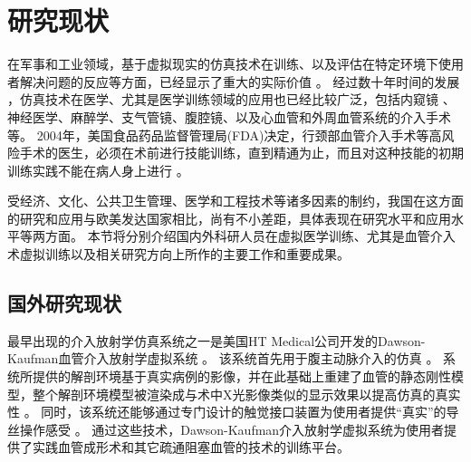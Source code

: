 
\section{研究现状}
\label{sec1-3}


在军事和工业领域，基于虚拟现实的仿真技术在训练、以及评估在特定环境下使用者解决问题的反应等方面，已经显示了重大的实际价值 \cite{Goodwin1978Simulator,Rolfe1986Simulators,Ressler1999Simulators,Wachtel1985Simulators,Liu2013Military}。%
经过数十年时间的发展 \cite{Dawson1998}，仿真技术在医学、尤其是医学训练领域的应用也已经比较广泛，包括内窥镜 \cite{Vining1995Endoscopy,Preminger1996Endoscopy}、神经医学\cite{Kockro2000Neurosurgery,Cotin2005EVE,Ma2007NeuroCath}、麻醉学\cite{Gaba1988Anesthesiology}、支气管镜\cite{Vining1996Bronchoscopy}、腹腔镜\cite{Hon1994Laparoscopy,Derossis1998Laparoscopy}、以及心血管和外周血管系统的介入手术\cite{Chui1998ICard,Cotin2000ICTS,Tan2012NUDT}等。%
2004年，美国食品药品监督管理局(FDA)决定，行颈部血管介入手术等高风险手术的医生，必须在术前进行技能训练，直到精通为止，而且对这种技能的初期训练实践不能在病人身上进行 \cite{Dawson2006Medicine}。%

受经济、文化、公共卫生管理、医学和工程技术等诸多因素的制约，我国在这方面的研究和应用与欧美发达国家相比，尚有不小差距，具体表现在研究水平和应用水平等两方面。
本节将分别介绍国内外科研人员在虚拟医学训练、尤其是血管介入术虚拟训练以及相关研究方向上所作的主要工作和重要成果。

\subsection{国外研究现状}
\label{sec1-4-1}

最早出现的介入放射学仿真系统之一是美国HT Medical公司开发的Dawson-Kaufman血管介入放射学虚拟系统 \cite{Higgins1995DK,Dawson1996DK,meglan1996DK}。
该系统首先用于腹主动脉介入的仿真 \cite{Wang1998ICard}。
系统所提供的解剖环境基于真实病例的影像，并在此基础上重建了血管的静态刚性模型，整个解剖环境模型被渲染成与术中X光影像类似的显示效果以提高仿真的真实性 \cite{Higgins1995DK}。
同时，该系统还能够通过专门设计的触觉接口装置为使用者提供“真实”的导丝操作感受 \cite{BroNielsen1997DK}。
通过这些技术，Dawson-Kaufman介入放射学虚拟系统为使用者提供了实践血管成形术和其它疏通阻塞血管的技术的训练平台。

